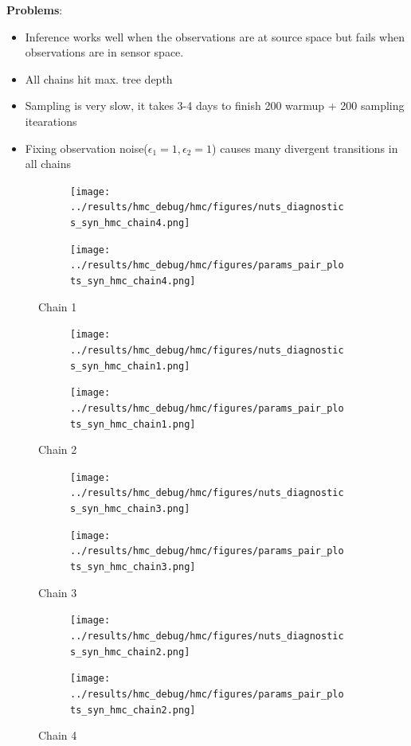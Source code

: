 \documentclass[12pt]{article}
\begin{document}
 \clearpage
 \textbf{Problems}: 
 \begin{itemize}
 \item Inference works well when the observations are at source space but fails when observations are in sensor space. 
 \item All chains hit max. tree depth
 \item Sampling is very slow, it takes 3-4 days to finish 200 warmup + 200 sampling itearations
 \item Fixing observation noise($\epsilon_1=1, \epsilon_2=1$) causes many divergent transitions in all chains
 \end{itemize}
 \begin{figure}[h!]
   \centering
   \begin{subfigure}{1.0\linewidth}
     \texttt{[image: ../results/hmc\_debug/hmc/figures/nuts\_diagnostics\_syn\_hmc\_chain4.png]}
   \end{subfigure}
   \begin{subfigure}{1.0\linewidth}
     \texttt{[image: ../results/hmc\_debug/hmc/figures/params\_pair\_plots\_syn\_hmc\_chain4.png]}
   \end{subfigure}
   \caption{Chain 1}
   \label{fig:nuts_diags_chain1}
 \end{figure}
 \begin{figure}[h!]
   \centering
   \begin{subfigure}{1.0\linewidth}
     \texttt{[image: ../results/hmc\_debug/hmc/figures/nuts\_diagnostics\_syn\_hmc\_chain1.png]}
   \end{subfigure}
   \begin{subfigure}{1.0\linewidth}
     \texttt{[image: ../results/hmc\_debug/hmc/figures/params\_pair\_plots\_syn\_hmc\_chain1.png]}
   \end{subfigure}
   \caption{Chain 2}
   \label{fig:nuts_diags_chain2}
 \end{figure}
 \begin{figure}[h!]
   \centering
   \begin{subfigure}{1.0\linewidth}
     \texttt{[image: ../results/hmc\_debug/hmc/figures/nuts\_diagnostics\_syn\_hmc\_chain3.png]}
   \end{subfigure}
   \begin{subfigure}{1.0\linewidth}
     \texttt{[image: ../results/hmc\_debug/hmc/figures/params\_pair\_plots\_syn\_hmc\_chain3.png]}
   \end{subfigure}
   \caption{Chain 3}
   \label{fig:nuts_diags_chain3}
 \end{figure}
 \begin{figure}[h!]
   \centering
   \begin{subfigure}{1.0\linewidth}
     \texttt{[image: ../results/hmc\_debug/hmc/figures/nuts\_diagnostics\_syn\_hmc\_chain2.png]}
   \end{subfigure}
   \begin{subfigure}{1.0\linewidth}
     \texttt{[image: ../results/hmc\_debug/hmc/figures/params\_pair\_plots\_syn\_hmc\_chain2.png]}
   \end{subfigure}
   \caption{Chain 4}
   \label{fig:nuts_diags_chain4}
 \end{figure}
\end{document}
